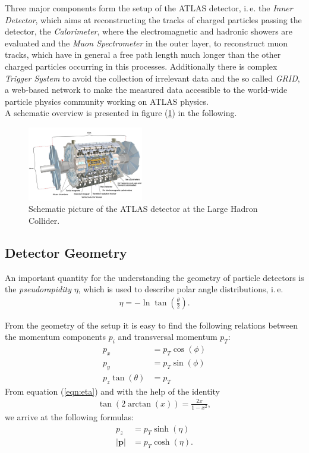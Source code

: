 \documentclass[twocolumn,
			   showpacs,%
               nofootinbib,
               aps,%
               prd,
               notitlepage,
               showkeys,
               10pt]{revtex4-1}
\begin{document}
Three major components form the setup of the ATLAS detector, i.\,e. the \textit{Inner Detector}, which aims at reconstructing the tracks of charged particles passing the detector, the \textit{Calorimeter}, where the electromagnetic and hadronic showers are evaluated and the \textit{Muon Spectrometer} in the outer layer, to reconstruct muon tracks, which have in general a free path length much longer than the other charged particles occurring in this processes. Additionally there is complex \textit{Trigger System} to avoid the collection of irrelevant data and the so called \textit{GRID}, a web-based network to make the measured data accessible to the world-wide particle physics community working on ATLAS physics. \\
A schematic overview is presented in figure (\ref{fig:atlas}) in the following.
\begin{figure}[H]
\centering
\includegraphics[width=0.45\textwidth]{figures/introduction/atlas}
\caption[Schematic picture of the ATLAS detector at the LHC.]{Schematic picture of the ATLAS detector at the Large Hadron Collider\footnotemark.}
\label{fig:atlas}
\end{figure}
\subsection{Detector Geometry}
An important quantity for the understanding the geometry of particle detectors is the \textit{pseudorapidity} $\eta$, which is used to describe polar angle distributions, i.\,e.
\begin{align}
\eta = -\ln \tan(\frac{\theta}{2}).	\label{eqn:eta}
\end{align}

From the geometry of the setup it is easy to find the following relations between the momentum components $p_i$ and transversal momentum $p_T$:
\begin{align}
	p_x &= p_T \cos(\phi)\\
	p_y &= p_T \sin(\phi)\\
	p_z \tan(\theta) &= p_T
\end{align}
From equation (\ref{eqn:eta}) and with the help of the identity
\begin{align*}
\tan(2\arctan(x)) = \frac{2x}{1 - x^2},
\end{align*} 
we arrive at the following formulas:
\begin{align}
	p_z &= p_T\sinh(\eta)\\
	\left|\mathbf{p}\right| &= p_T \cosh(\eta).
\end{align}
\end{document}
